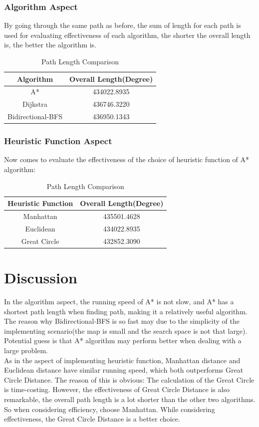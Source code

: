 \documentclass{article}
\begin{document}
	\subsubsection*{Algorithm Aspect}
	By going through the same path as before, the sum of length for each path is used for evaluating effectiveness of each algorithm, the shorter the overall length is, the better the algorithm is.
	\begin{table}[H]
		\centering
		\caption{Path Length Comparison}
		\begin{tabular}{cc}
			\toprule
			Algorithm & Overall Length(Degree) \\
			\midrule
			A* &  434022.8935 \\
			Dijkstra & 436746.3220 \\
			Bidirectional-BFS & 436950.1343 \\
			\bottomrule
		\end{tabular}
	\end{table}
	
	\subsubsection*{Heuristic Function Aspect}
	Now comes to evaluate the effectiveness of the choice of heuristic function of A* algorithm:
	\begin{table}[H]
		\centering
		\caption{Path Length Comparison}
		\begin{tabular}{cc}
			\toprule
			Heuristic Function & Overall Length(Degree) \\
			\midrule
			Manhattan &  435501.4628 \\
			Euclidean &  434022.8935 \\
			Great Circle &  432852.3090 \\
			\bottomrule
		\end{tabular}
	\end{table}
	
	\section*{Discussion}
	In the algorithm aspect, the running speed of A* is not slow, and A* has a shortest path length when finding path, making it a relatively useful algorithm. The reason why Bidirectional-BFS is so fast may due to the simplicity of the implementing scenario(the map is small and the search space is not that large). Potential guess is that A* algorithm may perform better when dealing with a large problem.\\
	As in the aspect of implementing heuristic function, Manhattan distance and Euclidean distance have similar running speed, which both outperforms Great Circle Distance. The reason of this is obvious: The calculation of the Great Circle is time-costing. However, the effectiveness of Great Circle Distance is also remarkable, the overall path length is a lot shorter than the other two algorithms. So when considering efficiency, choose Manhattan. While considering effectiveness, the Great Circle Distance is a better choice.
	
\end{document}
